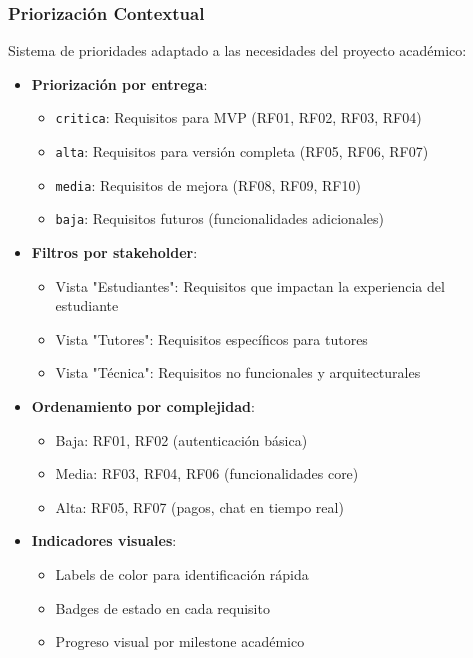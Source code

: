 \documentclass[12pt,a4paper]{article}
\begin{document}
\subsubsection{Priorización Contextual}

Sistema de prioridades adaptado a las necesidades del proyecto académico:

\begin{itemize}
    \item \textbf{Priorización por entrega}:
    \begin{itemize}
        \item \texttt{critica}: Requisitos para MVP (RF01, RF02, RF03, RF04)
        \item \texttt{alta}: Requisitos para versión completa (RF05, RF06, RF07)
        \item \texttt{media}: Requisitos de mejora (RF08, RF09, RF10)
        \item \texttt{baja}: Requisitos futuros (funcionalidades adicionales)
    \end{itemize}
    \item \textbf{Filtros por stakeholder}:
    \begin{itemize}
        \item Vista "Estudiantes": Requisitos que impactan la experiencia del estudiante
        \item Vista "Tutores": Requisitos específicos para tutores
        \item Vista "Técnica": Requisitos no funcionales y arquitecturales
    \end{itemize}
    \item \textbf{Ordenamiento por complejidad}:
    \begin{itemize}
        \item Baja: RF01, RF02 (autenticación básica)
        \item Media: RF03, RF04, RF06 (funcionalidades core)
        \item Alta: RF05, RF07 (pagos, chat en tiempo real)
    \end{itemize}
    \item \textbf{Indicadores visuales}:
    \begin{itemize}
        \item Labels de color para identificación rápida
        \item Badges de estado en cada requisito
        \item Progreso visual por milestone académico
    \end{itemize}
\end{itemize}
\end{document}
